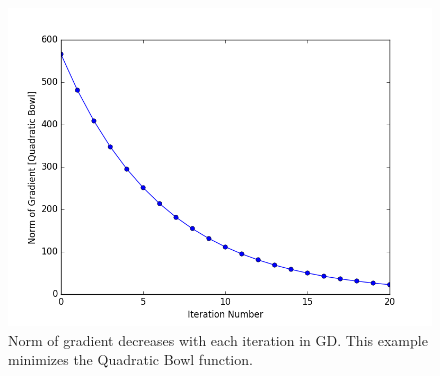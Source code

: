 \begin{figure}
	\centering
	\includegraphics [trim=0 0 0 0, clip, angle=0, width=0.8\columnwidth,
	keepaspectratio]{figures/1_1_gradient}
	\caption{Norm of gradient decreases with each iteration in GD. This example minimizes the Quadratic Bowl function.} 
	\label{fig:gradient} 
\end{figure}











